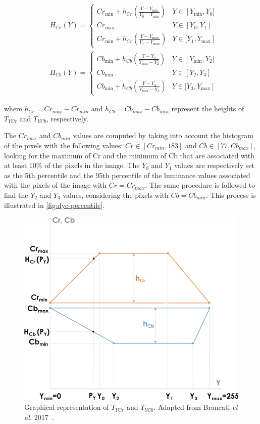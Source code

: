 \begin{equation}
\begin{aligned}
&H_{C r}(Y)=\left\{\begin{array}{ll}
C r_{\min }+h_{C r}\left(\frac{Y-Y_{\min }}{Y_{0}-Y_{\min }}\right) & Y \in\left[Y_{\min }, Y_{0}]\right. \\
C r_{\max } & Y \in\left[Y_{0}, Y_{1}\right] \\
C r_{\min }+h_{C r}\left(\frac{Y-Y_{\max }}{Y_{1}-Y_{\max }}\right) & \left.Y \in[ Y_{1}, Y_{\max }\right]
\end{array}\right. \\
&H_{C b}(Y)=\left\{\begin{array}{ll}
C b_{\min }+h_{C b}\left(\frac{Y-Y_{2}}{Y_{\min }-Y_{2}}\right) & Y \in\left[Y_{\min }, Y_{2}]\right. \\
C b_{\min } & Y \in\left[Y_{2}, Y_{3}\right] \\
C b_{\min }+h_{C b}\left(\frac{Y-Y_{3}}{Y_{\max }-Y_{3}}\right) & \left.Y \in[ Y_{3}, Y_{\max }\right]
\end{array}\right.
\end{aligned}
\end{equation}

where $h_{Cr} = Cr_{max} - Cr_{min}$ and $h_{Cb} = Cb_{max} - Cb_{min}$ represent the heights of $T_{YCr}$ and $T_{YCb}$, respectively.

\noindent The $Cr_{max}$ and $Cb_{min}$ values are computed by taking into account the histogram of the pixels with the following values: $Cr \in [Cr_{min}, 183]$ and $Cb \in [77,Cb_{max}]$, looking for the maximum of Cr and the minimum of Cb that are associated with at least 10\% of the pixels in the image.
The $Y_0$ and $Y_1$ values are respectively set as the 5th percentile and the 95th percentile of the luminance values associated with the pixels of the image with $Cr = Cr_{max}$.
The same procedure is followed to find the $Y_2$ and $Y_3$ values, considering the pixels with $Cb = Cb_{min}$. This process is illustrated in \autoref{fig:dyc-percentile}.

\begin{figure}[!htb]
	\centering
	\includegraphics[width=0.6\linewidth]{images/approaches/thresholding/trapezia_other_sides.png}
	\caption{Graphical representation of $T_{YCr}$ and $T_{YCb}$. Adapted from Brancati \textit{et al.} 2017~\cite{brancati2017human}.}
	\label{fig:trapeze-other-sides}
\end{figure}

